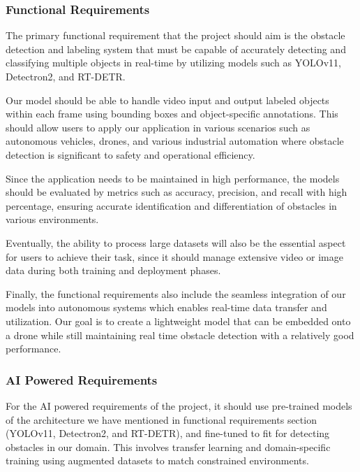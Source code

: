 \documentclass[stu,12pt,floatsintext]{apa7}
\begin{document}
\subsubsection{Functional Requirements}

The primary functional requirement that the project should aim is the obstacle detection and labeling system that must be capable of accurately detecting and classifying multiple objects in real-time by utilizing models such as YOLOv11, Detectron2, and RT-DETR.

Our model should be able to handle video input and output labeled objects within each frame using bounding boxes and object-specific annotations. This should allow users to apply our application in various scenarios such as autonomous vehicles, drones, and various industrial automation where obstacle detection is significant to safety and operational efficiency.

Since the application needs to be maintained in high performance, the models should be evaluated by metrics such as accuracy, precision, and recall with high percentage, ensuring accurate identification and differentiation of obstacles in various environments.

Eventually, the ability to process large datasets will also be the essential aspect for users to achieve their task, since it should manage extensive video or image data during both training and deployment phases.

Finally, the functional requirements also include the seamless integration of our models into autonomous systems which enables real-time data transfer and utilization. Our goal is to create a lightweight model that can be embedded onto a drone while still maintaining real time obstacle detection with a relatively good performance.

\subsubsection{AI Powered Requirements}

For the AI powered requirements of the project, it should use pre-trained models of the architecture we have mentioned in functional requirements section (YOLOv11, Detectron2, and RT-DETR), and fine-tuned to fit for detecting obstacles in our domain. This involves transfer learning and domain-specific training using augmented datasets to match constrained environments.
\end{document}
